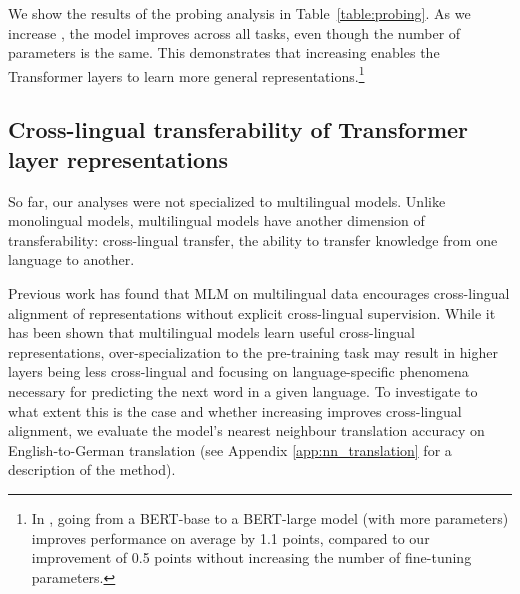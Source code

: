 \documentclass{article} \usepackage{iclr2021_conference,times}
\begin{document}
We show the results of the probing analysis in Table~\ref{table:probing}. As we increase , the model improves across all tasks, even though the number of parameters is the same. This demonstrates that increasing  enables the Transformer layers to learn more general representations.\footnote{In \citep{Tenney2019}, going from a BERT-base to a BERT-large model (with  more parameters) improves performance on average by 1.1 points, compared to our improvement of 0.5 points without increasing the number of fine-tuning parameters.}


\begin{table*}[t]
\caption{Probing analysis of~\citet{Tenney2019} with \texttt{mix} strategy.}
\label{table:probing}
\begin{center}
\end{center}
\end{table*}

\subsection{Cross-lingual transferability of Transformer layer representations}
\label{sec:cross-lingual-transfer}

So far, our analyses were not specialized to multilingual models. Unlike monolingual models, multilingual models have another dimension of transferability: cross-lingual transfer, the ability to transfer knowledge from one language to another.

Previous work \citep{Pires2019,artetxe2020cross} has found that MLM on multilingual data encourages cross-lingual alignment of representations without explicit cross-lingual supervision. 
While it has been shown that multilingual models learn useful cross-lingual representations, over-specialization to the pre-training task may result in higher layers being less cross-lingual and focusing on language-specific phenomena necessary for predicting the next word in a given language.
To investigate to what extent this is the case and whether increasing  improves cross-lingual alignment, we evaluate the model's nearest neighbour translation accuracy \citep{Pires2019} on English-to-German translation (see Appendix \ref{app:nn_translation} for a description of the method). 
\end{document}
